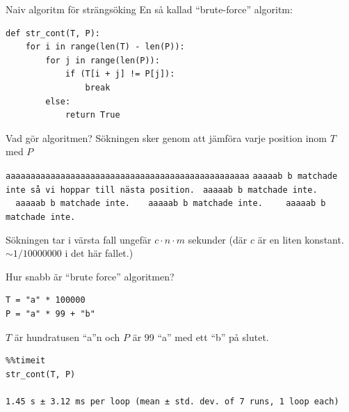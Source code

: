 \documentclass[11pt, aspectratio=169, table]{beamer}
\begin{document}
\begin{frame}[fragile]{Naiv algoritm för strängsöking}
\setlength{\parskip}{\fill}
En så kallad ``brute-force'' algoritm:

\begin{verbatim}
def str_cont(T, P):
    for i in range(len(T) - len(P)):
        for j in range(len(P)):
            if (T[i + j] != P[j]):
                break
        else:
            return True
\end{verbatim}
\end{frame}

\begin{frame}[fragile]{Vad gör algoritmen?}
\setlength{\parskip}{\fill}
Sökningen sker genom att jämföra varje position inom $T$ med $P$

\texttt{aaaaaaaaaaaaaaaaaaaaaaaaaaaaaaaaaaaaaaaaaaaaaaaaa}\linebreak
{\color{green}\texttt{aaaaa}}{\color{red}\texttt{b}}{\color{gray}\texttt{~b matchade inte så vi hoppar till nästa position.}}\linebreak
{\color{green}\texttt{~aaaaa}}{\color{red}\texttt{b}}{\color{gray}\texttt{~b matchade inte.}}\linebreak
{\color{green}\texttt{~~aaaaa}}{\color{red}\texttt{b}}{\color{gray}\texttt{~b matchade inte.}}\linebreak
{\color{green}\texttt{~~~aaaaa}}{\color{red}\texttt{b}}{\color{gray}\texttt{~b matchade inte.}}\linebreak
{\color{green}\texttt{~~~~aaaaa}}{\color{red}\texttt{b}}{\color{gray}\texttt{~b matchade inte.}}\linebreak

Sökningen tar i värsta fall ungefär $c \cdot n \cdot m$ sekunder (där $c$ är en liten konstant. $\sim 1 / 10000000$ i det här fallet.)
\end{frame}

\begin{frame}[fragile]{Hur snabb är ``brute force'' algoritmen?}
\setlength{\parskip}{\fill}
\begin{verbatim}
T = "a" * 100000
P = "a" * 99 + "b"
\end{verbatim}

$T$ är hundratusen ``a''n och $P$ är 99 ``a'' med ett ``b'' på slutet.

\begin{verbatim}
%%timeit
str_cont(T, P)

1.45 s ± 3.12 ms per loop (mean ± std. dev. of 7 runs, 1 loop each)
\end{verbatim}
\end{frame}
\end{document}
